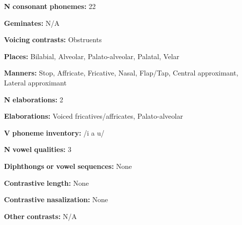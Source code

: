 \documentclass[output=paper]{langsci/langscibook}
\begin{document}
\begin{styleBody}
\textbf{N} \textbf{consonant} \textbf{phonemes:} 22
\end{styleBody}

\begin{styleBody}
\textbf{Geminates:} N/A
\end{styleBody}

\begin{styleBody}
\textbf{Voicing} \textbf{contrasts:} Obstruents
\end{styleBody}

\begin{styleBody}
\textbf{Places:} Bilabial, Alveolar, Palato-alveolar, Palatal, Velar
\end{styleBody}

\begin{styleBody}
\textbf{Manners:} Stop, Affricate, Fricative, Nasal, Flap/Tap, Central approximant, Lateral approximant
\end{styleBody}

\begin{styleBody}
\textbf{N} \textbf{elaborations:} 2
\end{styleBody}

\begin{styleBody}
\textbf{Elaborations:} Voiced fricatives/affricates, Palato-alveolar
\end{styleBody}

\begin{styleBody}
\textbf{V} \textbf{phoneme} \textbf{inventory:} /i a u/
\end{styleBody}

\begin{styleBody}
\textbf{N} \textbf{vowel} \textbf{qualities:} 3
\end{styleBody}

\begin{styleBody}
\textbf{Diphthongs} \textbf{or} \textbf{vowel} \textbf{sequences:} None
\end{styleBody}

\begin{styleBody}
\textbf{Contrastive} \textbf{length:} None
\end{styleBody}

\begin{styleBody}
\textbf{Contrastive} \textbf{nasalization:} None
\end{styleBody}

\begin{styleBody}
\textbf{Other} \textbf{contrasts:} N/A
\end{styleBody}
\end{document}
